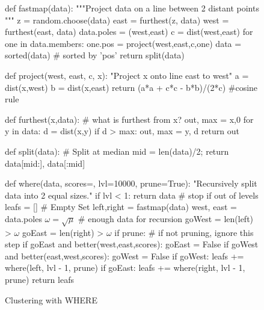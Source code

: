 \documentclass[conference]{IEEEtran}
\begin{document}
\begin{figure}[!b]
\begin{python}[right]
def fastmap(data): 
  """Project data on a line 
     between 2 distant points
  """
  z          = random.choose(data)
  east       = furthest(z, data)
  west       = furthest(east, data)
  data.poles = (west,east)
  c          = dist(west,east)     
  for one in data.members: 
    one.pos = project(west,east,c,one)
  data = sorted(data) # sorted by 'pos'
  return split(data)

def project(west, east, c, x): 
  "Project x onto line east to west"
  a = dist(x,west)
  b = dist(x,east)
  return (a*a + c*c - b*b)/(2*c) #cosine rule

def furthest(x,data): 
  # what is furthest from x?
  out, max = x,0
  for y in data:
    d = dist(x,y)
    if d > max: out, max = y, d
  return out

def split(data): # Split at median
   mid = len(data)/2; 
  return data[mid:], data[:mid]

def where(data, scores={}, 
          lvl=10000, prune=True):  
  "Recursively split data into 2 equal sizes."
  if lvl < 1: 
     return data # stop if out of levels
  leafs      = [] # Empty Set
  left,right = fastmap(data)
  west, east = data.poles
  $\omega=\sqrt{\mu}$ # enough data for recursion
  goWest = len(left) > $\omega$  
  goEast = len(right) > $\omega$ 
  if prune: # if not pruning, ignore this step
    if goEast and better(west,east,scores): 
       goEast = False 
    if goWest and better(east,west,scores): 
       goWest = False 
  if goWest:  
     leafs += where(left,  lvl - 1, prune)  
  if goEast:  
     leafs += where(right, lvl - 1, prune) 
  return leafs

\end{python}
\caption{Clustering with WHERE}
\label{fig:fastmapCode}   
\end{figure}
\end{document}
